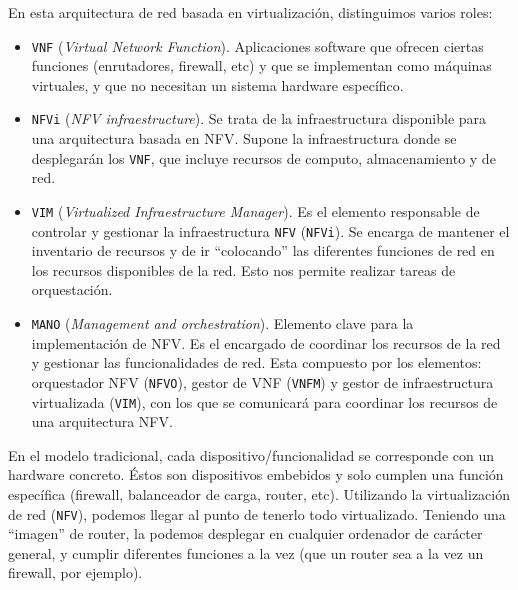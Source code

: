 \documentclass[a4paper, oneside, 12pt]{book}
\begin{document}
	\noindent En esta arquitectura de red basada en virtualización, distinguimos varios roles: 
	\begin{itemize}
		\item \texttt{VNF} (\textit{Virtual Network Function}). Aplicaciones software que ofrecen ciertas funciones (enrutadores, firewall, etc) y que se implementan como máquinas virtuales, y que no necesitan un sistema hardware específico. 
		
		\item \texttt{NFVi} (\textit{NFV infraestructure}). Se trata de la infraestructura disponible para una arquitectura basada en NFV. Supone la infraestructura donde se desplegarán los \texttt{VNF}, que incluye recursos de computo, almacenamiento y de red. 
		
		\item \texttt{VIM} (\textit{Virtualized Infraestructure Manager}). Es el elemento responsable de controlar y gestionar la infraestructura \texttt{NFV} (\texttt{NFVi}). Se encarga de mantener el inventario de recursos y de ir ``colocando'' las diferentes funciones de red en los recursos disponibles de la red. Esto nos permite realizar tareas de orquestación.
		
		\item \texttt{MANO} (\textit{Management and orchestration}). Elemento clave para la implementación de NFV. Es el encargado de coordinar los recursos de la red y gestionar las funcionalidades de red. Esta compuesto por los elementos: orquestador NFV (\texttt{NFVO}), gestor de VNF (\texttt{VNFM}) y gestor de infraestructura virtualizada (\texttt{VIM}), con los que se comunicará para coordinar los recursos de una arquitectura NFV.
	\end{itemize}
	
	\pagebreak
	
	\noindent En el modelo tradicional, cada dispositivo/funcionalidad se corresponde con un hardware concreto. Éstos son dispositivos embebidos y solo cumplen una función específica (firewall, balanceador de carga, router, etc). Utilizando la virtualización de red (\texttt{NFV}), podemos llegar al punto de tenerlo todo virtualizado. Teniendo una ``imagen'' de router, la podemos desplegar en cualquier ordenador de carácter general, y cumplir diferentes funciones a la vez (que un router sea a la vez un firewall, por ejemplo). \\
	
\end{document}
